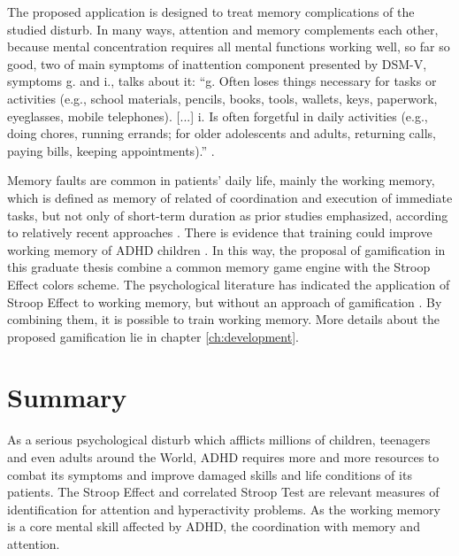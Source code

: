 The proposed application is designed to treat memory complications of the studied disturb. In many ways, attention and memory complements each other, because mental concentration requires all mental functions working well, so far so good, two of main symptoms of inattention component presented by DSM-V, symptoms g. and i., talks about it: ``g. Often loses things necessary for tasks or activities (e.g., school materials, pencils, books, tools, wallets, keys, paperwork, eyeglasses, mobile telephones).  [...] i. Is often forgetful in daily activities (e.g., doing chores, running errands; for older adolescents and adults, returning calls, paying bills, keeping appointments).'' \cite{dsm-american}.

Memory faults are common in patients' daily life, mainly the working memory, which is defined as memory of related of coordination and execution of immediate tasks, but not only of short-term duration as prior studies emphasized, according to relatively recent approaches \citep{working_memory}. There is evidence that training could improve working memory of ADHD children \citep{adhd_memory}. In this way, the proposal of gamification in this graduate thesis combine a common memory game engine with the Stroop Effect colors scheme. The psychological literature has indicated the application  of Stroop Effect to working memory, but without an approach of gamification \citep{Debr-2002}. By combining them, it is possible to train working memory. More details about the proposed gamification lie in chapter \ref{ch:development}.





\section{Summary}



As a serious psychological disturb which afflicts millions of children, teenagers and even adults around the World, ADHD requires more and more resources to combat its symptoms and improve damaged skills and life conditions of its patients. The Stroop Effect and correlated Stroop Test are relevant measures of identification for attention and hyperactivity problems. As the working memory is a core mental skill affected by ADHD, the coordination with memory and attention.
